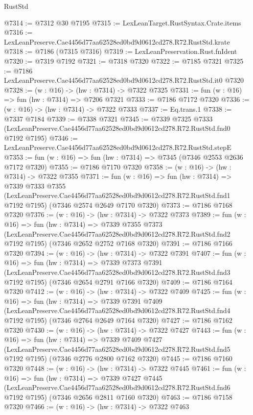 \begin{lexlean}{RustStd}
\begin{coremodule}
@7314 := @7312 @30 @7195
@7315 := LexLeanTarget.RustSyntax.Crate.items
@7316 := LexLeanPreserve.Cae4456d77aa62528ed0bd9d0612cd278.R72.RustStd.krate
@7318 := @7186 (@7315 @7316)
@7319 := LexLeanPreservation.Rust.fnIdent
@7320 := @7319 @7192
@7321 := @7318 @7320
@7322 := @7185 @7321
@7325 := @7186 LexLeanPreserve.Cae4456d77aa62528ed0bd9d0612cd278.R72.RustStd.it0 @7320
@7328 := (w : @16) -> (hw : @7314) -> @7322 @7325
@7331 := fun (w : @16) => fun (hw : @7314) => @7206 @7321
@7333 := @7186 @7172 @7320
@7336 := (w : @16) -> (hw : @7314) -> @7322 @7333
@7337 := Eq.trans.{1}
@7338 := @7337 @7184
@7339 := @7338 @7321
@7345 := @7339
    @7325
    @7333
    (LexLeanPreserve.Cae4456d77aa62528ed0bd9d0612cd278.R72.RustStd.fnd0 @7192 @7195)
@7346 := LexLeanPreserve.Cae4456d77aa62528ed0bd9d0612cd278.R72.RustStd.stepE
@7353 := fun (w : @16) => fun (hw : @7314) => @7345 (@7346 @2553 @2636 @7172 @7320)
@7355 := @7186 @7170 @7320
@7358 := (w : @16) -> (hw : @7314) -> @7322 @7355
@7371 := fun (w : @16) =>
  fun (hw : @7314) =>
  @7339
    @7333
    @7355
    (LexLeanPreserve.Cae4456d77aa62528ed0bd9d0612cd278.R72.RustStd.fnd1 @7192 @7195)
    (@7346 @2574 @2649 @7170 @7320)
@7373 := @7186 @7168 @7320
@7376 := (w : @16) -> (hw : @7314) -> @7322 @7373
@7389 := fun (w : @16) =>
  fun (hw : @7314) =>
  @7339
    @7355
    @7373
    (LexLeanPreserve.Cae4456d77aa62528ed0bd9d0612cd278.R72.RustStd.fnd2 @7192 @7195)
    (@7346 @2652 @2752 @7168 @7320)
@7391 := @7186 @7166 @7320
@7394 := (w : @16) -> (hw : @7314) -> @7322 @7391
@7407 := fun (w : @16) =>
  fun (hw : @7314) =>
  @7339
    @7373
    @7391
    (LexLeanPreserve.Cae4456d77aa62528ed0bd9d0612cd278.R72.RustStd.fnd3 @7192 @7195)
    (@7346 @2654 @2791 @7166 @7320)
@7409 := @7186 @7164 @7320
@7412 := (w : @16) -> (hw : @7314) -> @7322 @7409
@7425 := fun (w : @16) =>
  fun (hw : @7314) =>
  @7339
    @7391
    @7409
    (LexLeanPreserve.Cae4456d77aa62528ed0bd9d0612cd278.R72.RustStd.fnd4 @7192 @7195)
    (@7346 @2764 @2649 @7164 @7320)
@7427 := @7186 @7162 @7320
@7430 := (w : @16) -> (hw : @7314) -> @7322 @7427
@7443 := fun (w : @16) =>
  fun (hw : @7314) =>
  @7339
    @7409
    @7427
    (LexLeanPreserve.Cae4456d77aa62528ed0bd9d0612cd278.R72.RustStd.fnd5 @7192 @7195)
    (@7346 @2776 @2800 @7162 @7320)
@7445 := @7186 @7160 @7320
@7448 := (w : @16) -> (hw : @7314) -> @7322 @7445
@7461 := fun (w : @16) =>
  fun (hw : @7314) =>
  @7339
    @7427
    @7445
    (LexLeanPreserve.Cae4456d77aa62528ed0bd9d0612cd278.R72.RustStd.fnd6 @7192 @7195)
    (@7346 @2656 @2811 @7160 @7320)
@7463 := @7186 @7158 @7320
@7466 := (w : @16) -> (hw : @7314) -> @7322 @7463

\end{coremodule}
\end{lexlean}
